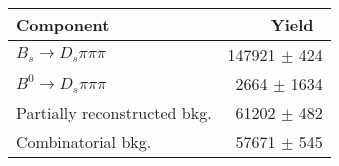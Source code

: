  \begin{tabular}{l r }
\hline\hline
Component & Yield\ \\
\hline
$B_s \to D_s \pi \pi \pi$ & 147921 $\pm$ 424 \\
$B^{0} \to D_s \pi \pi \pi$ & 2664 $\pm$ 1634 \\
Partially reconstructed bkg. & 61202 $\pm$ 482 \\
Combinatorial bkg. & 57671 $\pm$ 545 \\
\hline\hline
\end{tabular}
\label{table:normYields}
